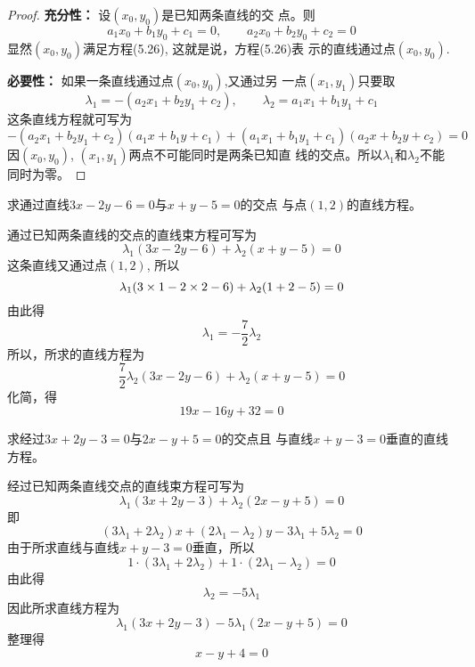 \begin{proof}
\textbf{充分性：} 设$(x_0, y_0)$是已知两条直线的交
点。则
\[a_1x_0+b_1y_0+c_1=0,\qquad a_2x_0+b_2y_0+c_2=0\]
显然$(x_0, y_0)$满足方程(5.26), 这就是说，方程(5.26)表
示的直线通过点$(x_0, y_0)$.

\textbf{必要性：} 如果一条直线通过点$(x_0, y_0)$,又通过另
一点$(x_1,y_1)$只要取
\[\lambda_1=-(a_2x_1+b_2y_1+c_2),\qquad \lambda_2=a_1x_1+b_1y_1+c_1\]
这条直线方程就可写为
\[-(a_2x_1+b_2y_1+c_2)(a_1x+b_1y+c_1)+(a_1x_1+b_1y_1+c_1)(a_2x+b_2y+c_2)=0\]
因$(x_0, y_0)$, $(x_1,y_1)$两点不可能同时是两条已知直
线的交点。所以$\lambda_1$和$\lambda_2$不能
同时为零。
\end{proof}

\begin{figure}[htp]
    \centering
{}
    \caption{}
\end{figure}

\begin{example}
    求通过直线$3x-2y-6=0$与$x+y-5=0$的交点
与点$(1,2)$的直线方程。
\end{example}

\begin{solution}
    通过已知两条直线的交点的直线束方程可写为
\[\lambda_1(3x-2y-6)+\lambda_2(x+y-5)=0\]
这条直线又通过点$(1,2)$, 所以
\[\lambda_1(3\times1-2\times2-6)+\lambda_2(1+2-5)=0\]
由此得
\[\lambda_1=-\frac{7}{2}\lambda_2\]
所以，所求的直线方程为
\[\frac{7}{2}\lambda_2(3x-2y-6)+\lambda_2(x+y-5)=0\]
化简，得
\[19x-16y+32=0\]
\end{solution}

\begin{example}
    求经过$3x+2y-3=0$与$2x-y+5=0$的交点且
与直线$x+y-3=0$垂直的直线方程。
\end{example}

\begin{solution}
    经过已知两条直线交点的直线束方程可写为
\[\lambda_1(3x+2y-3)+\lambda_2(2x-y+5)=0\]
即
\[(3\lambda_1+2\lambda_2)x+(2\lambda_1-\lambda_2)y-3\lambda_1+5\lambda_2=0\]
由于所求直线与直线$x+y-3=0$垂直，所以
\[1\cdot (3\lambda_1+2\lambda_2)+1\cdot (2\lambda_1-\lambda_2)=0\]
由此得
\[\lambda_2=-5\lambda_1\]
因此所求直线方程为
\[\lambda_1(3x+2y-3)-5\lambda_1(2x-y+5)=0\]
整理得
\[x-y+4=0\]
\end{solution}

